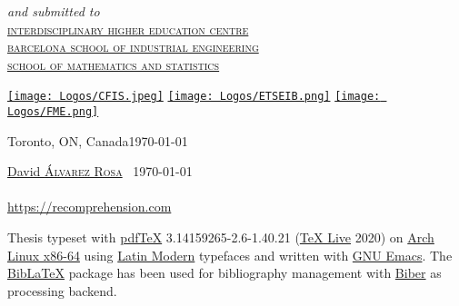\begin{titlepage}
  \large
  \textsl{and submitted to}\Large\\[-.25ex]
  \scshape
  \href{https://cfis.upc.edu/en}{interdisciplinary higher education centre}\\[-.5ex]
  \href{https://etseib.upc.edu/en}{barcelona school of industrial engineering}\\[-.5ex]
  \href{https://fme.upc.edu/en}{school of mathematics and statistics}


  \vfill
  \href{https://cfis.upc.edu/en}{\texttt{[image: Logos/CFIS.jpeg]}}
  \hspace{1em}
  \href{https://etseib.upc.edu/en}{\texttt{[image: Logos/ETSEIB.png]}}
  \hspace{1em}
  \href{https://fme.upc.edu/en}{\texttt{[image: Logos/FME.png]}}\\[1ex]

  \vfill

  \normalsize
  Toronto, ON, Canada\hfill\today
\end{titlepage}




\thispagestyle{empty}
\small
\null\vfill

\begin{center}
\end{center}

\vspace{1ex}
\noindent\href{https://david.alvarezrosa.com/}{David \textsc{Álvarez Rosa}}
\textcopyright\ \today\\
\makeatletter\href{https://recomprehension.com/}{\textsl{\@title}}\makeatother\\
\url{https://recomprehension.com}


\bigskip
\noindent Thesis typeset with
\href{http://tug.org/applications/pdftex/}{pdf\TeX{}} 3.14159265-2.6-1.40.21
(\href{https://www.tug.org/svn/texlive/}{\TeX{} Live} 2020) on
\href{https://archlinux.org/}{Arch Linux x86-64} using
\href{https://www.ctan.org/tex-archive/fonts/lm/}{Latin Modern} typefaces and
written with \href{https://www.gnu.org/software/emacs/}{GNU Emacs}. The
\href{https://www.ctan.org/pkg/biblatex}{Bib\LaTeX{}} package has been used for
bibliography management with
\href{http://biblatex-biber.sourceforge.net/}{Biber} as processing backend.

